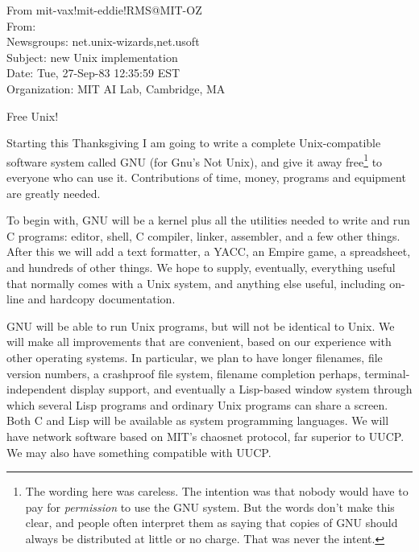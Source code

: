 \begin{quot}
From mit-vax!mit-eddie!RMS@MIT-OZ\\
From: \\
Newsgroups: net.unix-wizards,net.usoft\\
Subject: new Unix implementation\\
Date: Tue, 27-Sep-83 12:35:59 EST\\
Organization: MIT AI Lab, Cambridge, MA

\medskip

Free Unix!

\medskip

Starting this Thanksgiving I am going to write a complete
Unix-compatible software system called GNU (for Gnu's Not Unix), and
give it away free\footnote{
The wording here was careless. The intention was that nobody would
have to pay for \emph{permission} to use the GNU system. But the words
don't make this clear, and people often interpret them as saying that
copies of GNU should always be distributed at little or no
charge. That was never the intent.
} to everyone who can use it.  Contributions of time, money, programs
and equipment are greatly needed.

\medskip

To begin with, GNU will be a kernel plus all the utilities needed to
write and run C programs: editor, shell, C compiler, linker,
assembler, and a few other things. After this we will add a text
formatter, a YACC, an Empire game, a spreadsheet, and hundreds of
other things. We hope to supply, eventually, everything useful that
normally comes with a Unix system, and anything else useful, including
on-line and hardcopy documentation.

\medskip

GNU will be able to run Unix programs, but will not be identical to
Unix. We will make all improvements that are convenient, based on our
experience with other operating systems. In particular, we plan to
have longer filenames, file version numbers, a crashproof file system,
filename completion perhaps, terminal-independent display support, and
eventually a Lisp-based window system through which several Lisp
programs and ordinary Unix programs can share a screen.  Both C and
Lisp will be available as system programming languages.  We will have
network software based on MIT's chaosnet protocol, far superior to
UUCP. We may also have something compatible with UUCP.


\end{quot}
